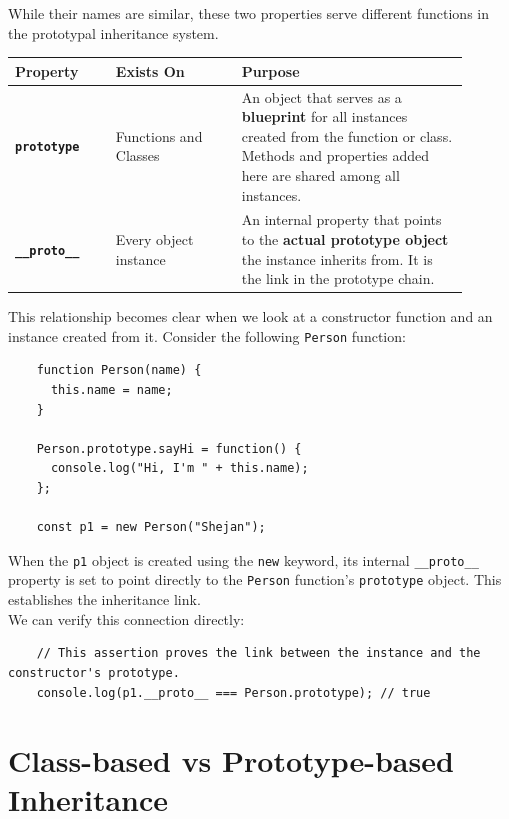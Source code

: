 \documentclass{scrbook}
\begin{document}
While their names are similar, these two properties serve different functions in the prototypal inheritance system.

\begin{center}
    \begin{tabular}{|p{0.2\linewidth}|p{0.25\linewidth}|p{0.45\linewidth}|}
    \hline    
        Property & Exists On & Purpose \\ \hline
        
        \texttt{\textbf{prototype}} &
        Functions and Classes &
        An object that serves as a \textbf{blueprint} for all instances created from the function or class. Methods and properties added here are shared among all instances. \\ \hline
        
        \texttt{\textbf{\_\_proto\_\_}} &
        Every object instance &
        An internal property that points to the \textbf{actual prototype object} the instance inherits from. It is the link in the prototype chain. \\ \hline
    \end{tabular}
\end{center}

This relationship becomes clear when we look at a constructor function and an instance created from it. Consider the following \texttt{Person} function:

\begin{lstlisting}
    function Person(name) {
      this.name = name;
    }
    
    Person.prototype.sayHi = function() {
      console.log("Hi, I'm " + this.name);
    };
    
    const p1 = new Person("Shejan");
\end{lstlisting}

When the \texttt{p1} object is created using the \texttt{new} keyword, its internal \texttt{\_\_proto\_\_} property is set to point directly to the \texttt{Person} function's \texttt{prototype} object. This establishes the inheritance link. \\

We can verify this connection directly:

\begin{lstlisting}
    // This assertion proves the link between the instance and the constructor's prototype.
    console.log(p1.__proto__ === Person.prototype); // true
\end{lstlisting}

\section{Class-based vs Prototype-based Inheritance}
\end{document}
